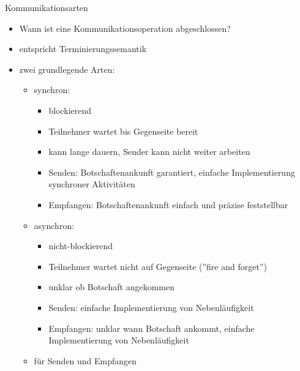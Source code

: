 \documentclass[10pt]{article}
\begin{document}
Kommunikationsarten
\begin{itemize}
  \item Wann ist eine Kommunikationsoperation abgeschlossen?
  \item entspricht Terminierungssemantik
  \item zwei grundlegende Arten:
        \begin{itemize}
          \item synchron:
                \begin{itemize}
                  \item blockierend
                  \item Teilnehmer wartet bis Gegenseite bereit
                  \item kann lange dauern, Sender kann nicht weiter arbeiten
                  \item Senden: Botschaftenankunft garantiert, einfache Implementierung synchroner Aktivitäten
                  \item Empfangen: Botschaftenankunft einfach und präzise feststellbar
                \end{itemize}
          \item asynchron:
                \begin{itemize}
                  \item nicht-blockierend
                  \item Teilnehmer wartet nicht auf Gegenseite (”fire and forget”)
                  \item unklar ob Botschaft angekommen
                  \item Senden: einfache Implementierung von Nebenläufigkeit
                  \item Empfangen: unklar wann Botschaft ankommt, einfache Implementierung von Nebenläufigkeit
                \end{itemize}
          \item für Senden und Empfangen
        \end{itemize}
\end{itemize}
\end{document}
